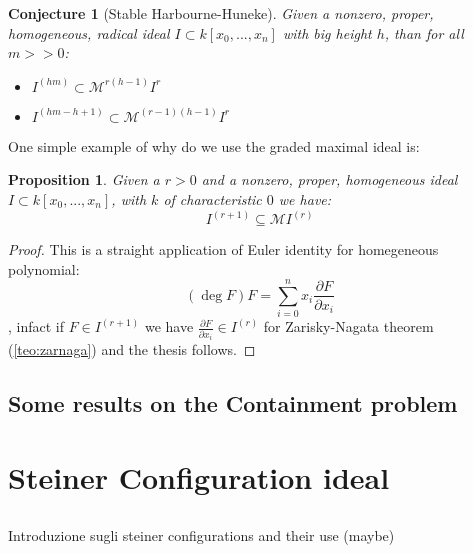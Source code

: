 \documentclass[]{book}
\theoremstyle{plain}
\newtheorem{prop}[teo]{Proposition}
\newtheorem{conj}[teo]{Conjecture}
\theoremstyle{remark}
\theoremstyle{definition}
\newcommand{\parder}[2]{ \frac{\partial #1}{\partial #2} }
\newcommand{\MM}{\mathcal{M}}
\begin{document}
	\begin{conj}[Stable Harbourne-Huneke]\label{conj:stabharbhun}
	Given a nonzero, proper, homogeneous, radical ideal $ I \subset k[x_0 , ... , x_n] $ with big height $ h $, than for all $ m >> 0 $:
	\begin{itemize}
	\item $ I^{(hm)} \subset \MM^{r(h-1)} I^r$
	\item $ I^{(hm - h +1 )} \subset \MM^{(r-1)(h-1)} I^r $
	\end{itemize}
	\end{conj}
	
	One simple example of why do we use the graded maximal ideal is:
	
	\begin{prop} \label{prop:eulid}
	Given a $ r>0 $ and a nonzero, proper, homogeneous ideal $ I \subset k[x_0 , ... , x_n] $, with $ k $ of characteristic $ 0 $ we have:
	\[ I^{(r+1)}   \subseteq \MM I^{(r)}\]
	\end{prop}
	\begin{proof}
	This is a straight application of Euler identity for homegeneous polynomial:
	\[ (\deg{F})F = \sum_{i=0}^{n} x_i \parder{F}{x_i} \]
	, infact if $ F \in I^{(r+1)} $ we have $ \parder{F}{x_i} \in I^{(r)} $ for Zarisky-Nagata theorem (\ref{teo:zarnaga}) and the thesis follows.
 	\end{proof}
 	

\section{Some results on the Containment problem}

	
 	
 	
	


\chapter{Steiner Configuration ideal}
\section*{}
\begin{tcolorbox}
Introduzione sugli steiner configurations and their use (maybe)
\end{tcolorbox}
\end{document}
